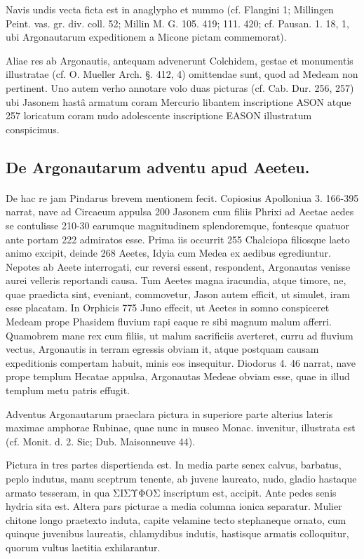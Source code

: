 \documentclass[a4paper, 11pt, oneside, polutonikogreek, german]{article}
\begin{document}
Navis undis vecta ficta est in anaglypho et nummo (cf. Flangini 1; Millingen Peint. vas. gr. div. coll. 52; Millin M. G. 105. 419; 111. 420; cf. Pausan. 1. 18, 1, ubi Argonautarum expeditionem a Micone pictam commemorat).

Aliae res ab Argonautis, antequam advenerunt Colchidem, gestae et monumentis illustratae (cf. O. Mueller Arch. §. 412, 4) omittendae sunt, quod ad Medeam non pertinent. Uno autem verho annotare volo duas picturas (cf. Cab. Dur. 256, 257) ubi Jasonem hastâ armatum coram Mercurio libantem inscriptione ASON atque 257 loricatum coram nudo adolescente inscriptione EASON illustratum conspicimus.

\subsection{De Argonautarum adventu apud Aeeteu.}
\paragraph{}
De hac re jam Pindarus brevem mentionem fecit. Copiosius Apolloniua 3. 166-395 narrat, nave ad Circaeum appulsa 200 Jasonem cum filiis Phrixi ad Aeetae aedes se contulisse 210-30 earumque magnitudinem splendoremque, fontesque quatuor ante portam 222 admiratos esse. Prima iis occurrit 255 Chalciopa filiosque laeto animo excipit, deinde 268 Aeetes, Idyia cum Medea ex aedibus egrediuntur. Nepotes ab Aeete interrogati, cur reversi essent, respondent, Argonautas venisse aurei velleris reportandi causa. Tum Aeetes magna iracundia, atque timore, ne, quae praedicta sint, eveniant, commovetur, Jason autem efficit, ut simulet, iram esse placatam. In Orphicis 775 Juno effecit, ut Aeetes in somno conspiceret Medeam prope Phasidem fluvium rapi eaque re sibi magnum malum afferri. Quamobrem mane rex cum filiis, ut malum sacrificiis averteret, curru ad fluvium vectus, Argonautis in terram egressis obviam it, atque postquam causam expeditionis compertam habuit, minis eos insequitur. Diodorus 4. 46 narrat, nave prope templum Hecatae appulsa, Argonautas Medeae obviam esse, quae in illud templum metu patris effugit.

Adventus Argonautarum praeclara pictura in superiore parte alterius lateris maximae amphorae Rubinae, quae nunc in museo Monac. invenitur, illustrata est (cf. Monit. d. 2. Sic; Dub. Maisonneuve 44).

Pictura in tres partes dispertienda est. In media parte senex calvus, barbatus, peplo indutus, manu sceptrum tenente, ab juvene laureato, nudo, gladio hastaque armato tesseram, in qua ΣΙΣΥΦΟΣ inscriptum est, accipit. Ante pedes senis hydria sita est. Altera pars picturae a media columna ionica separatur. Mulier chitone longo praetexto induta, capite velamine tecto stephaneque ornato, cum quinque juvenibus laureatis, chlamydibus indutis, hastisque armatis colloquitur, quorum vultus laetitia exhilarantur.
\end{document}
